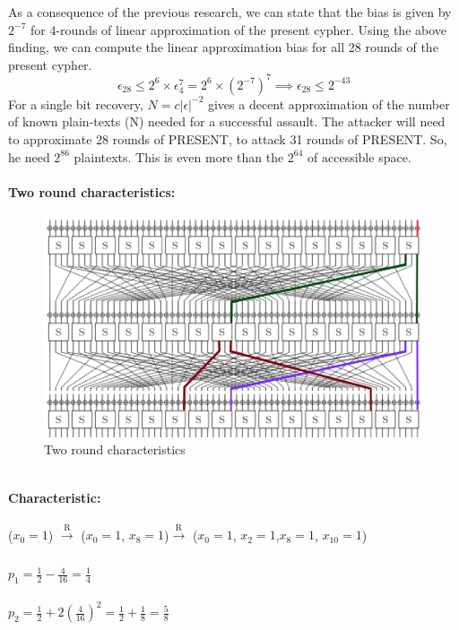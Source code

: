 \documentclass[journal=tosc,preprint]{iacrtrans}
\begin{document}
As a consequence of the previous research, we can state that the bias is given by $2^{-7}$ for 4-rounds of linear approximation of the present cypher. Using the above finding, we can compute the linear approximation bias for all 28 rounds of the present cypher. 
 \begin{equation*}
\epsilon_{28} \leq 2^{6} \times \epsilon_4^{7} = 2^6 \times (2^{-7})^7 \implies \epsilon_{28} \leq 2^{-43}
\end{equation*}
For a single bit recovery, $N = c|\epsilon|^{-2}$ gives a decent approximation of the number of known plain-texts (N) needed for a successful assault.
The attacker will need to approximate 28 rounds of PRESENT, to attack 31 rounds of PRESENT. So, he need $2^{86}$ plaintexts. This is even more than the $2^{64}$ of accessible space. \\\\
\textbf{Two round characteristics:}
\begin{figure}[h!]
	\centering
	\includegraphics[width=1.0\linewidth, height=0.32\textheight]{LC2}
	\caption{Two round characteristics}
	\label{fig:lc2}
\end{figure}\\
\textbf{Characteristic:}\\\\
	($x_0 = 1$) $\xrightarrow[]{\text{R}}$ ($x_0 = 1$, $x_8 = 1$)$\xrightarrow[]{\text{R}}$ ($x_0 = 1$, $x_2 = 1$,$x_8 = 1$, $x_{10} = 1$)\\\\
	$p_1= \frac{1}{2}-\frac{4}{16}=\frac{1}{4}$\\\\
	$p_2=\frac{1}{2}+2(\frac{4}{16})^2=\frac{1}{2}+\frac{1}{8}=\frac{5}{8}$\\\\\\
\end{document}

